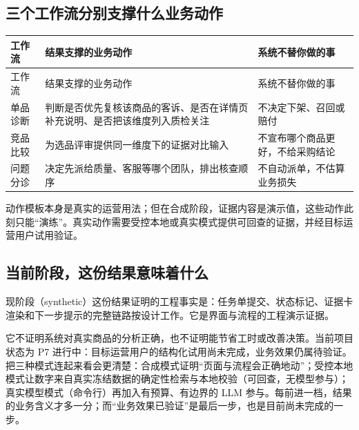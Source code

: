 \subsection{三个工作流分别支撑什么业务动作}

\begin{longtable}{>{\raggedright\arraybackslash}p{}>{\raggedright\arraybackslash}p{}>{\raggedright\arraybackslash}p{}}
\toprule
工作流 & 结果支撑的业务动作 & 系统不替你做的事 \\
\midrule
\endfirsthead
\toprule
工作流 & 结果支撑的业务动作 & 系统不替你做的事 \\
\midrule
\endhead
单品诊断 & 判断是否优先复核该商品的客诉、是否在详情页补充说明、是否把该维度列入质检关注 & 不决定下架、召回或赔付 \\
竞品比较 & 为选品评审提供同一维度下的证据对比输入 & 不宣布哪个商品更好，不给采购结论 \\
问题分诊 & 决定先派给质量、客服等哪个团队，排出核查顺序 & 不自动派单，不估算业务损失 \\
\bottomrule
\end{longtable}

\begin{advicebox}
动作模板本身是真实的运营用法；但在合成阶段，证据内容是演示值，这些动作此刻只能“演练”。真实动作需要受控本地或真实模式提供可回查的证据，并经目标运营用户试用验证。
\end{advicebox}

\subsection{当前阶段，这份结果意味着什么}

\begin{factbox}
现阶段（synthetic）这份结果证明的工程事实是：任务单提交、状态标记、证据卡渲染和下一步提示的完整链路按设计工作。它是界面与流程的工程演示证据。
\end{factbox}

\begin{boundarybox}
它不证明系统对真实商品的分析正确，也不证明能节省工时或改善决策。当前项目状态为 P7 进行中：目标运营用户的结构化试用尚未完成，业务效果仍属待验证。把三种模式连起来看会更清楚：合成模式证明“页面与流程会正确地动”；受控本地模式让数字来自真实冻结数据的确定性检索与本地校验（可回查，无模型参与）；真实模型模式（命令行）再加入有预算、有边界的 LLM 参与。每前进一档，结果的业务含义才多一分；而“业务效果已验证”是最后一步，也是目前尚未完成的一步。
\end{boundarybox}

